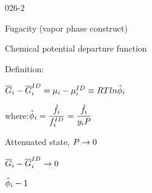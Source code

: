 \begin{mitframe}{026-2}

 	
    \begin{listone}
 
    	\item Fugacity (vapor phase construct) 
    
    	\begin{listtwo}
        
        	\item Chemical potential departure function
            
            \item Definition:                       
            
            \begin{listthree}

				\item $\overline{\gibbs}_{\state}-\overline{\gibbs}_{\state}^{\mominertia\elecdisplace}=\chempot_{\state}-\chempot_{\state}^{\mominertia\elecdisplace}\equiv\gasconst\Temp{ln}\hat\eleccoeff_{\state}$
                
                
                \begin{listfour}
                
                	\item where:$\hat\eleccoeff_{\state}=\dfrac{\hat\fug_{\state}}{\fug_{\state}^{\mominertia\elecdisplace}}=\dfrac{\hat\fug_{\state}}{y_{\state}\p}$
                    
                    
                    
                    

				\end{listfour}
                
                \item Attenuated state, $\p \rightarrow 0$ 
                
                \begin{listfour}
                
                	\item $\overline\gibbs_{\state}-\overline\gibbs_{\state}^{\mominertia\elecdisplace}\rightarrow{0}$
                    
                    \item$\hat\eleccoeff_{\state}-1$
                    

				\end{listfour}
                
	
			\end{listthree}

		\end{listtwo}    
        
\end{listone}        
        
\end{mitframe}